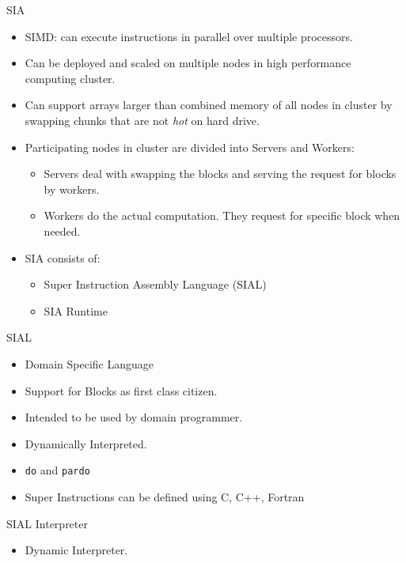 \documentclass[pdf]{beamer}
\begin{document}
\begin{frame}{SIA}
  \begin{itemize}
    \pause
  \item SIMD: can execute instructions in parallel over multiple processors.
    \pause
  \item Can be deployed and scaled on multiple nodes in high performance computing cluster.
    \pause
  \item Can support arrays larger than combined memory of all nodes in cluster by
    swapping chunks that are not \textit{hot} on hard drive.
    \pause
  \item Participating nodes in cluster are divided into Servers and Workers:
    \begin{itemize}
      \pause
    \item Servers deal with swapping the blocks and serving the request for blocks
      by workers.
    \item Workers do the actual computation. They request for specific block when
      needed.
    \end{itemize}
    \pause
  \item SIA consists of:
    \begin{itemize}
      \pause
    \item Super Instruction Assembly Language (SIAL)
      \pause
    \item SIA Runtime
    \end{itemize}
  \end{itemize}
\end{frame}

\begin{frame}{SIAL}
  \begin{itemize}
    \pause
  \item Domain Specific Language
    \pause
  \item Support for Blocks as first class citizen.
    \pause
  \item Intended to be used by domain programmer.
    \pause
  \item Dynamically Interpreted.
    \pause
  \item \texttt{do} and \texttt{pardo}
    \pause
  \item Super Instructions can be defined using C, C++, Fortran
    \pause
  \end{itemize}
\end{frame}

\begin{frame}{SIAL Interpreter}
  \begin{itemize}
      \item Dynamic Interpreter.
  \end{itemize}
\end{frame}
\end{document}
